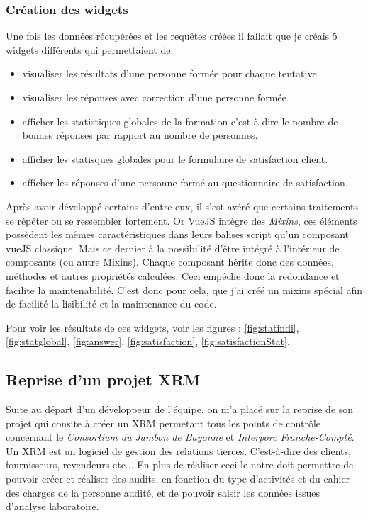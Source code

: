 \subsubsection{Création des widgets}

Une fois les données récupérées et les requêtes créées il fallait que je créais 5 widgets différents qui permettaient de: 
\begin{itemize}
    \item visualiser les résultats d'une personne formée pour chaque tentative. 
    \item  visualiser les réponses avec correction d'une personne formée.
    \item afficher les statistiques globales de la formation c'est-à-dire le nombre de bonnes réponses par rapport au nombre de personnes.
    \item afficher les statisques globales pour le formulaire de satisfaction client. 
    \item afficher les réponses d'une personne formé au questionnaire de satisfaction.  
\end{itemize}

Après avoir développé certains d'entre eux, il s'est avéré que certains traitements se répéter ou se ressembler fortement. Or VueJS intègre des \textit{Mixins}, ces éléments possèdent les mêmes caractéristiques dans leurs balises script qu'un composant vueJS classique. Mais ce dernier à la possibilité d'être intégré à l'intérieur de composants (ou autre Mixins). Chaque composant hérite donc des données, méthodes et autres propriétés calculées. Ceci empêche donc la redondance et facilite la maintenabilité.
C'est donc pour cela, que j'ai créé un mixins spécial afin de facilité la lisibilité et la maintenance du code. 

Pour voir les résultats de ces widgets, voir les figures :           \ref{fig:statindi}, \ref{fig:statglobal}, \ref{fig:answer}, \ref{fig:satisfaction}, \ref{fig:satisfactionStat}.


\subsection{Reprise d'un projet XRM}
Suite au départ d'un développeur de l'équipe, on m'a placé sur la reprise de son projet qui consite à créer un XRM permetant tous les points de contrôle concernant le \textit{Consortium du Jambon de Bayonne} et \textit{Interporc Franche-Compté}.
Un XRM est un logiciel de gestion des relations tierces. C'est-à-dire des clients, fournisseurs, revendeurs etc... En plus de réaliser ceci le notre doit permettre de pouvoir créer et réaliser des audits, en fonction du type d'activités et du cahier des charges de la personne audité, et de pouvoir saisir les données issues d'analyse laboratoire.

